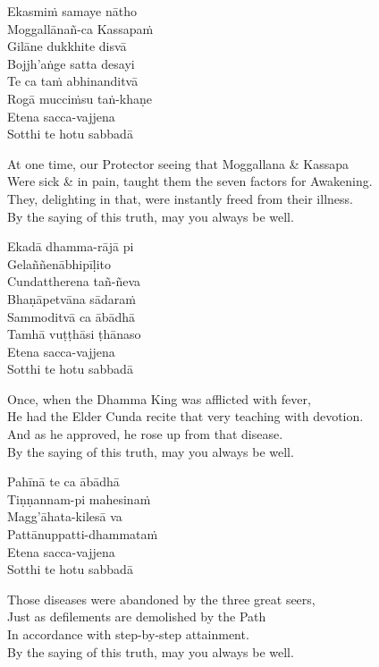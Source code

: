 Ekasmiṁ samaye nātho\\
Moggallānañ-ca Kassapaṁ\\
Gilāne dukkhite disvā\\
Bojjh’aṅge satta desayi\\
Te ca taṁ abhinanditvā\\
Rogā mucciṁsu taṅ-khaṇe\\
Etena sacca-vajjena\\
Sotthi te hotu sabbadā

\begin{english}
  At one time, our Protector seeing that Moggallana \& Kassapa\\
  Were sick \& in pain, taught them the seven factors for Awakening.\\
  They, delighting in that, were instantly freed from their illness.\\
  By the saying of this truth, may you always be well.
\end{english}

Ekadā dhamma-rājā pi\\
Gelaññenābhipīḷito\\
Cundattherena tañ-ñeva\\
Bhaṇāpetvāna sādaraṁ\\
Sammoditvā ca ābādhā\\
Tamhā vuṭṭhāsi ṭhānaso\\
Etena sacca-vajjena\\
Sotthi te hotu sabbadā

\begin{english}
  Once, when the Dhamma King was afflicted with fever,\\
  He had the Elder Cunda recite that very teaching with devotion.\\
  And as he approved, he rose up from that disease.\\
  By the saying of this truth, may you always be well.
\end{english}

Pahīnā te ca ābādhā\\
Tiṇṇannam-pi mahesinaṁ\\
Magg’āhata-kilesā va\\
Pattānuppatti-dhammataṁ\\
Etena sacca-vajjena\\
Sotthi te hotu sabbadā

\begin{english}
  Those diseases were abandoned by the three great seers,\\
  Just as defilements are demolished by the Path\\
  In accordance with step-by-step attainment.\\
  By the saying of this truth, may you always be well.
\end{english}


